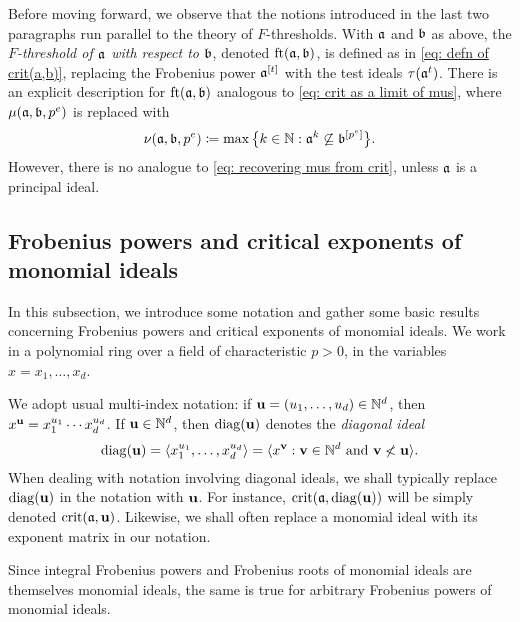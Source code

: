 \documentclass[11pt]{amsart}
\begin{document}
Before moving forward, we observe that the notions introduced in the last two paragraphs run parallel to the theory of $F$-thresholds.
With $\mathfrak{a}$ and $\mathfrak{b}$ as above, the \emph{$F$-threshold of $\mathfrak{a}$ with respect to $\mathfrak{b}$}, denoted $\operatorname{ft}(\mathfrak{a}, \mathfrak{b})$, is defined as in \eqref{eq: defn of crit(a,b)}, replacing the Frobenius power $\mathfrak{a}^{[t]}$ with the test ideals $\tau(\mathfrak{a}^t)$.
There is an explicit description for $\operatorname{ft}(\mathfrak{a}, \mathfrak{b})$ analogous to \eqref{eq: crit as a limit of mus}, where $\mu(\mathfrak{a},\mathfrak{b},p^e)$ is replaced with
\[\nu(\mathfrak{a},\mathfrak{b},p^e) \coloneqq \max\big\{k\in \mathbb{N} : \mathfrak{a}^{k} \not\subseteq \mathfrak{b}^{[p^e]}\big\}.\]
However, there is no analogue to \eqref{eq: recovering mus from crit}, unless $\mathfrak{a}$ is a principal ideal.

\subsection{Frobenius powers and critical exponents of monomial ideals}

In this subsection, we introduce some notation and gather some basic results concerning Frobenius powers and critical exponents of monomial ideals.
We work in a polynomial ring over a field of characteristic $p>0$, in the variables $x=x_1,\ldots,x_d$.

\begin{notation}
   We adopt usual multi-index notation: if $\mathbf{u} = (u_1,\ldots,u_d)\in \mathbb{N}^d$, then $x^{\mathbf{u}} = x_1^{u_1}\cdots x_d^{u_d}$.   If $\mathbf{u}\in \mathbb{N}^d$, then $\operatorname{diag}(\mathbf{u})$ denotes the \emph{diagonal ideal} 
   \[ \operatorname{diag}(\mathbf{u}) = \langle x_1^{u_1},\ldots,x_d^{u_d} \rangle = \langle x^{\mathbf{v}} : \mathbf{v} \in \mathbb{N}^d \text{ and } \mathbf{v} \not < \mathbf{u} \rangle.\] 
   When dealing with notation involving diagonal ideals, we shall typically replace $\operatorname{diag}(\mathbf{u})$ in the notation with $\mathbf{u}$.
   For instance, $\operatorname{crit}(\mathfrak{a},\operatorname{diag}(\mathbf{u}))$ will be simply denoted $\operatorname{crit}(\mathfrak{a},\mathbf{u})$.   
   Likewise, we shall often replace a monomial ideal with its exponent matrix in our notation.
\end{notation}

\begin{remark}\label{rmk: Frobenius powers of monomial ideals are monomial ideals}
   Since integral Frobenius powers and Frobenius roots of monomial ideals are themselves monomial ideals, the same is true for arbitrary Frobenius powers of monomial ideals. 
\end{remark}
\end{document}
